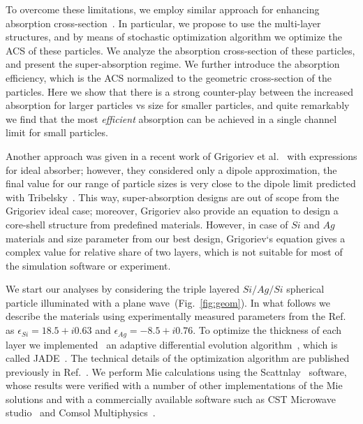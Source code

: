 \documentclass[aps,prl,twocolumn,showpacs,superscriptaddress,groupedaddress]{revtex4-1}
\begin{document}
To overcome these limitations, we employ similar approach for
enhancing absorption cross-section~\cite{Fan-2011}. In particular, we
propose to use the multi-layer structures, and by means of stochastic optimization
algorithm we optimize the ACS of these particles. We analyze the
absorption cross-section of these particles, and present the
super-absorption regime. We further introduce the absorption
efficiency, which is the ACS normalized to the geometric cross-section
of the particles. Here we show that there is a strong counter-play
between the increased absorption for larger particles vs size for
smaller particles, and quite remarkably we find that the most {\em
  efficient} absorption can be achieved in a single channel limit for
small particles.

Another approach was given in a recent work of Grigoriev et
al.~\cite{Grigoriev-2015} with expressions for ideal absorber;
however, they considered only a dipole approximation, the final value
for our range of particle sizes is very close to the dipole limit
predicted with Tribelsky~\cite{Tribelsky-2011}.  This way,
super-absorption designs are out of scope from the Grigoriev ideal
case; moreover, Grigoriev also provide an equation to design a
core-shell structure from predefined materials. However, in case of
$Si$ and $Ag$ materials and size parameter from our best design,
Grigoriev`s equation gives a complex value for relative share of two
layers, which is not suitable for most of the simulation software or
experiment.


\begin{figure}
\end{figure}


We start our analyses by considering the triple layered $Si/Ag/Si$
spherical particle illuminated with a plane
wave~(Fig.~\ref{fig:geom}). In what follows we describe the materials
using experimentally measured parameters from the
Ref.~\cite{palik-1997} as $\epsilon_{Si} = 18.5 + i0.63$ and
$\epsilon_{Ag} = -8.5 + i0.76$.  To optimize the thickness of each
layer we implemented~\cite{JADE-web} an adaptive differential
evolution algorithm~\cite{Storn-DE-first-1997}, which is called
JADE~\cite{Jingqiao-JADE-2009}.  The technical details of the
optimization algorithm are published previously in
Ref.~\cite{Ladutenko-2014}. We perform Mie calculations using the
Scattnlay~\cite{Pena-scattnlay-2009,Scattnlay-web} software, whose
results were verified with a number of other implementations of the
Mie solutions and with a commercially available software such as CST
Microwave studio~\cite{CST-web} and Comsol
Multiphysics~\cite{Comsol-web}.
\end{document}
